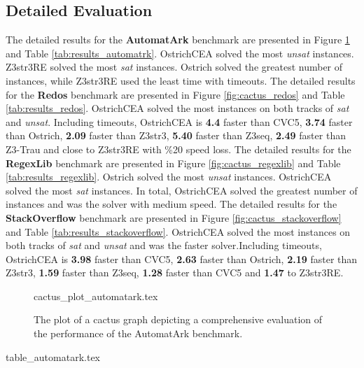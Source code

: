 \subsection{Detailed Evaluation}
The detailed results for the \textbf{AutomatArk} benchmark are presented in Figure \ref{fig:cactus_automatrk} and Table \ref{tab:results_automatrk}. OstrichCEA solved the most \emph{unsat} instances. Z3str3RE solved the most \emph{sat} instances. Ostrich solved the greatest number of instances, while Z3str3RE used the least time with timeouts.\newline
The detailed results for the \textbf{Redos} benchmark are presented in Figure \ref{fig:cactus_redos} and Table \ref{tab:results_redos}. OstrichCEA solved the most instances on both tracks of \emph{sat} and \emph{unsat}. Including timeouts, OstrichCEA is \textbf{4.4}\mult{} faster than CVC5, \textbf{3.74}\mult{} faster than Ostrich, \textbf{2.09}\mult{} faster than Z3str3, \textbf{5.40}\mult{} faster than Z3seq, \textbf{2.49}\mult{} faster than Z3-Trau and close to Z3str3RE with \%20 speed loss. \newline 
The detailed results for the \textbf{RegexLib} benchmark are presented in Figure \ref{fig:cactus_regexlib} and Table \ref{tab:results_regexlib}. Ostrich solved the most \emph{unsat} instances. OstrichCEA solved the most \emph{sat} instances. In total, OstrichCEA solved the greatest number of instances and was the solver with medium speed. \newline
The detailed results for the \textbf{StackOverflow} benchmark are presented in Figure \ref{fig:cactus_stackoverflow} and Table \ref{tab:results_stackoverflow}. OstrichCEA solved the most instances on both tracks of \emph{sat} and \emph{unsat} and was the faster solver.\newline Including timeouts, OstrichCEA is \textbf{3.98}\mult{} faster than CVC5, \textbf{2.63}\mult{} faster than Ostrich, \textbf{2.19}\mult{} faster than Z3str3, \textbf{1.59}\mult{} faster than Z3seq, \textbf{1.28}\mult{} faster than CVC5 and \textbf{1.47}\mult{} to Z3str3RE. \newline
\begin{figure}
  \centering
  {cactus_plot_automatark.tex}
  \caption{The plot of a cactus graph depicting a comprehensive evaluation of the performance of the AutomatArk benchmark.}
  \label{fig:cactus_automatrk}
\end{figure}
\begin{table}
  {table_automatark.tex}
  \caption{Detailed results for the AutomatArk benchmark.}
  \label{tab:results_automatrk}
\end{table}

